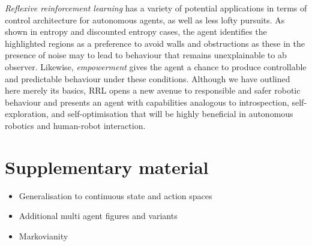 \documentclass{article}
\begin{document}
\emph{Reflexive reinforcement learning}
has a variety of potential applications in terms of control architecture for autonomous agents, as well as less lofty pursuits. 
As shown in entropy and discounted entropy cases, the agent identifies the 
highlighted regions as a preference to avoid walls and obstructions as these in the presence of
noise may to lead to behaviour that remains unexplainable to ab observer. Likewise, \emph{empowerment} gives the agent a chance to produce controllable and predictable behaviour under these conditions. Although we have outlined here merely its basics,  RRL opens a new avenue to responsible and safer robotic behaviour and presents an agent with capabilities analogous to introspection, self-exploration, and self-optimisation that will be highly beneficial in autonomous robotics and 
human-robot interaction.






\section*{Supplementary material}
\begin{itemize}
	\item Generalisation to continuous state and action spaces
	\item Additional multi agent figures and variants
	\item Markovianity
\end{itemize}
\end{document}
